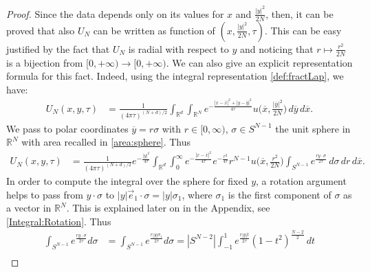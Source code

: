 \documentclass[11pt, twoside, notitlepage]{amsart}
\newcommand\R{\mathbb{R}}
\numberwithin{equation}{section}
\begin{document}
\begin{proof}
Since the data depends only on its values for $x$ and $\frac{|y|^2}{2N}$, then, it can be proved that also $U_N$ can be written as function of $(x, \frac{|y|^2}{2N},\tau )$.  This can be easy justified by the fact that  $U_N$ is radial with respect to $y$ and noticing that $ r \mapsto \frac{r^2}{2N}$ is a bijection from $[0, + \infty) \to [0, + \infty)$.  We can also give an explicit representation formula for this fact.
Indeed, using the integral representation  \eqref{def:fractLap}, we have:
\begin{align*}
  U_N(x,y,\tau) & = \frac{1}{(4 \pi \tau)^{(N+d)/2}}  \int_{\R^d} \int_{\R^N} e^{ - \frac{|x-\overline{x}|^2 + |y-\overline{y}|^2}{4 \tau} } u\big(\overline{x}, \frac{|\overline{y}|^2}{2N} \big) \, d \overline{y}\, d \overline{x}.
  \end{align*}
  We pass to polar coordinates $\overline{y}=r \sigma$ with $r\in [0,\infty)$, $\sigma \in S^{N-1}$ the unit sphere in $\mathbb{R}^N$ with area recalled in \eqref{area:sphere}. Thus
    \begin{align*}
  U_N(x,y,\tau)
   &= \frac{1}{(4 \pi \tau)^{(N+d)/2}}  e^{ - \frac{ |y|^2 }{4 \tau} }   \int_{\R^d}  \int_0^\infty
   e^{ - \frac{|x-\overline{x}|^2 }{4 \tau} } e^{ - \frac{  r^2}{4 \tau} }  r^{N-1 }u\big(\overline{x}, \frac{r^2}{2N} \big)
   \int_{S^{N-1}} e^{  \frac{ r  y \cdot \sigma}{2 \tau} } \, d\sigma  \, d r\, d \overline{x}.
\end{align*}
In order to compute the integral over the sphere for fixed $y$, a rotation argument helps to pass from $y\cdot \sigma$ to $|y| \vec{e}_1 \cdot \sigma  = |y| \sigma_1$, where $\sigma_1$ is the first component of $\sigma$ as a vector in $\R^N$. This is explained later on in the Appendix, see \eqref{Integral:Rotation}.
Thus
\begin{align*}
  \int_{S^{N-1}}   e^{  \frac{ r  y \cdot \sigma}{2 \tau} }  d\sigma&= \int_{S^{N-1}}   e^{  \frac{ r  |y| \sigma_1}{2 \tau} }  d\sigma =  |S^{N-2}| \int_{-1}^1   e^{  \frac{ r  |y| t }{2 \tau} } (1-t^2)^{\frac{N-2}{2}} \, d t  \\[2mm]

\end{align*}
\end{proof}
\end{document}
